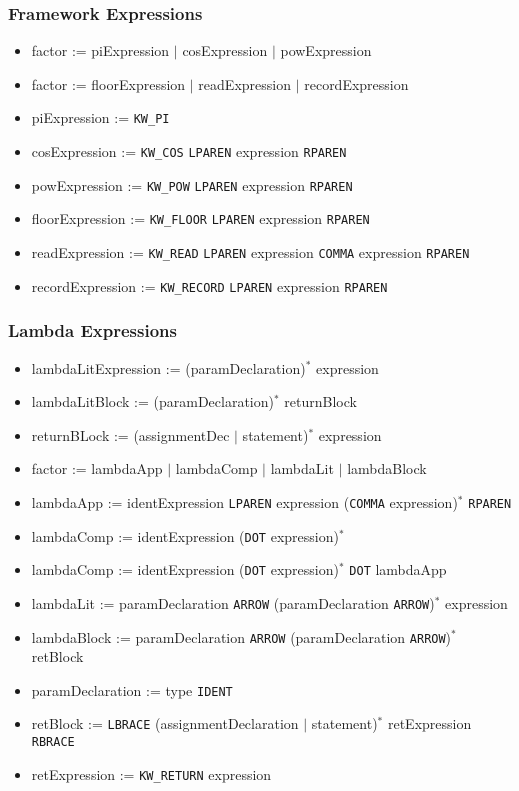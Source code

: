 \subsubsection{Framework Expressions}

\begin{itemize}
	\item factor := piExpression $|$ cosExpression $|$ powExpression
	\item factor := floorExpression $|$ readExpression $|$ recordExpression
	\item piExpression := \texttt{KW\_PI}
	\item cosExpression := \texttt{KW\_COS} \texttt{LPAREN} expression \texttt{RPAREN}
	\item powExpression := \texttt{KW\_POW} \texttt{LPAREN} expression \texttt{RPAREN}
	\item floorExpression := \texttt{KW\_FLOOR} \texttt{LPAREN} expression \texttt{RPAREN}
	\item readExpression := \texttt{KW\_READ} \texttt{LPAREN} expression \texttt{COMMA} expression \texttt{RPAREN}
	\item recordExpression := \texttt{KW\_RECORD} \texttt{LPAREN} expression \texttt{RPAREN}
\end{itemize}

\subsubsection{Lambda Expressions}

\begin{itemize}
	\item lambdaLitExpression := (paramDeclaration)$^*$ expression
	\item lambdaLitBlock := (paramDeclaration)$^*$ returnBlock
	\item returnBLock := (assignmentDec $|$ statement)$^*$ expression


	\item factor := lambdaApp $|$ lambdaComp $|$ lambdaLit $|$ lambdaBlock
	\item lambdaApp := identExpression \texttt{LPAREN} expression (\texttt{COMMA} expression)$^*$ \texttt{RPAREN}
	\item lambdaComp := identExpression (\texttt{DOT} expression)$^*$
	\item lambdaComp := identExpression (\texttt{DOT} expression)$^*$ \texttt{DOT} lambdaApp
	\item lambdaLit := paramDeclaration \texttt{ARROW} (paramDeclaration \texttt{ARROW})$^*$ expression
	\item lambdaBlock := paramDeclaration \texttt{ARROW} (paramDeclaration \texttt{ARROW})$^*$ retBlock
	\item paramDeclaration := type \texttt{IDENT}
	\item retBlock := \texttt{LBRACE} (assignmentDeclaration $|$ statement)$^*$ retExpression \texttt{RBRACE}
	\item retExpression := \texttt{KW\_RETURN} expression
\end{itemize}

